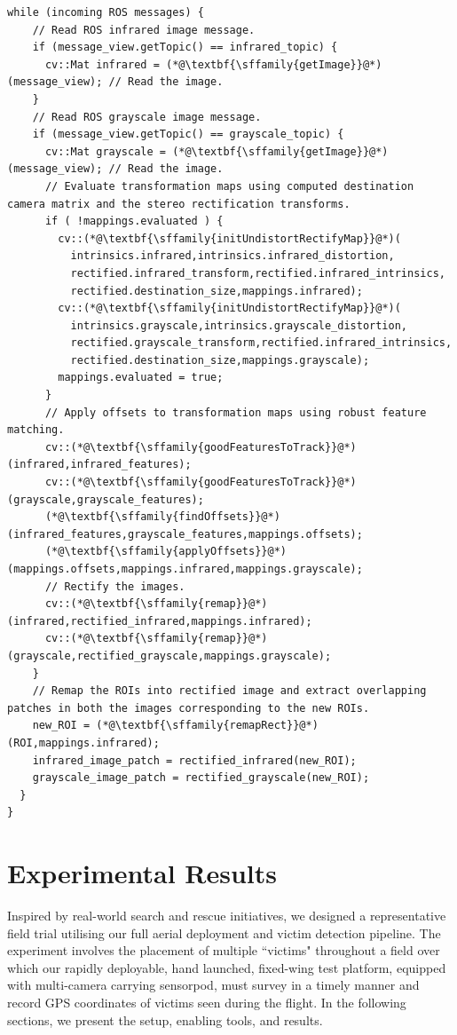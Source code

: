 \documentclass[runningheads]{llncs}
\begin{document}
\begin{lstlisting}[caption=Pseudo-code for Image fusion, label=pseudo, frame=single]
  while (incoming ROS messages) {
    // Read ROS infrared image message.
    if (message_view.getTopic() == infrared_topic) {
      cv::Mat infrared = (*@\textbf{\sffamily{getImage}}@*)(message_view); // Read the image.
    }
    // Read ROS grayscale image message.
    if (message_view.getTopic() == grayscale_topic) {
      cv::Mat grayscale = (*@\textbf{\sffamily{getImage}}@*)(message_view); // Read the image.
      // Evaluate transformation maps using computed destination camera matrix and the stereo rectification transforms.
      if ( !mappings.evaluated ) {
        cv::(*@\textbf{\sffamily{initUndistortRectifyMap}}@*)(
          intrinsics.infrared,intrinsics.infrared_distortion, 
          rectified.infrared_transform,rectified.infrared_intrinsics, 
          rectified.destination_size,mappings.infrared);
        cv::(*@\textbf{\sffamily{initUndistortRectifyMap}}@*)(
          intrinsics.grayscale,intrinsics.grayscale_distortion,
          rectified.grayscale_transform,rectified.infrared_intrinsics,
          rectified.destination_size,mappings.grayscale);
        mappings.evaluated = true;
      }
      // Apply offsets to transformation maps using robust feature matching.
      cv::(*@\textbf{\sffamily{goodFeaturesToTrack}}@*)(infrared,infrared_features);
      cv::(*@\textbf{\sffamily{goodFeaturesToTrack}}@*)(grayscale,grayscale_features);
      (*@\textbf{\sffamily{findOffsets}}@*)(infrared_features,grayscale_features,mappings.offsets);
      (*@\textbf{\sffamily{applyOffsets}}@*)(mappings.offsets,mappings.infrared,mappings.grayscale);    
      // Rectify the images.
      cv::(*@\textbf{\sffamily{remap}}@*)(infrared,rectified_infrared,mappings.infrared);
      cv::(*@\textbf{\sffamily{remap}}@*)(grayscale,rectified_grayscale,mappings.grayscale);
    }
    // Remap the ROIs into rectified image and extract overlapping patches in both the images corresponding to the new ROIs.
    new_ROI = (*@\textbf{\sffamily{remapRect}}@*)(ROI,mappings.infrared);
    infrared_image_patch = rectified_infrared(new_ROI);
    grayscale_image_patch = rectified_grayscale(new_ROI);
  }
}
\end{lstlisting}


\section{Experimental Results}

Inspired by real-world search and rescue initiatives, we designed a representative field trial utilising our full aerial deployment and victim detection pipeline. The experiment involves the placement of multiple ``victims" throughout a field over which our rapidly deployable, hand launched, fixed-wing test platform, equipped with multi-camera carrying sensorpod, must survey in a timely manner and record GPS coordinates of victims seen during the flight. In the following sections, we present the setup, enabling tools, and results.
\end{document}
